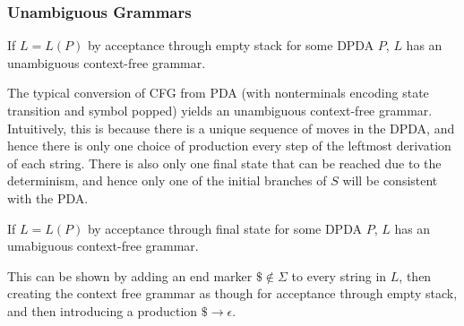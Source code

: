 \subsubsection{Unambiguous Grammars}
\begin{theorem}
  If $L=L(P)$ by acceptance through empty stack for some DPDA $P$, $L$ has an
  unambiguous context-free grammar.
\end{theorem}
The typical conversion of CFG from PDA (with nonterminals encoding state
transition and symbol popped) yields an unambiguous context-free grammar.
Intuitively, this is because there is a unique sequence of moves in the DPDA,
and hence there is only one choice of production every step of the leftmost
derivation of each string. There is also only one final state that can be
reached due to the determinism, and hence only one of the initial branches of
$S$ will be consistent with the PDA\@.

\begin{theorem}
  If $L=L(P)$ by acceptance through final state for some DPDA  $P$, $L$ has an
  umabiguous context-free grammar.
\end{theorem}
This can be shown by adding an end marker $\$\not\in\Sigma$ to every string in
$L$, then creating the context free grammar as though for acceptance through
empty stack, and then introducing a production $\$\to\epsilon$.
